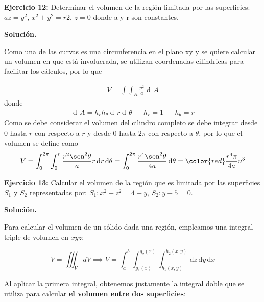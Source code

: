 \documentclass[12pt]{article}
\DeclareMathOperator{\di}{d\!}
\begin{document}
\noindent \textbf{Ejercicio 12:} Determinar el volumen de la región limitada por
 las superficies: $az = y^2$, $x^2+y^2 = r2$, $z=0$ donde a y r son constantes.

\vspace{5mm}

\noindent \textbf{Solución.}

\vspace{3mm}

Como una de las curvas es una circunferencia en el plano xy y se quiere calcular un
volumen en que está involucrada, se utilizan coordenadas cilíndricas para facilitar
los cálculos, por lo que 

\begin{align*}
	V = \int\int_{R} \frac{y^2}{a} \di A
\end{align*}
donde
\begin{align*}
	\di A = h_{r}h_{\theta} \di r \di \theta && h_{r}=1 && h_{\theta} = r
\end{align*} 
Como se debe considerar el volumen del cilindro completo se debe integrar desde
$0$ hasta $r$ con respecto a $r$ y desde $0$ hasta $2\pi$ con 
respecto a $\theta$, por lo que el volumen se define
como
\begin{align*}
	V = \int_{0}^{2\pi}\int_{0}^{r} \frac{r^2\sen^2\theta}{a}r \di r \di \theta
	= \int_0^{2\pi} \frac{r^4\sen^2\theta}{4a} \di \theta =\color{red} \frac{r^4\pi}{4a} u^3	
\end{align*} 

\noindent \textbf{Ejercicio 13:} Calcular el volumen de la región que es limitada por las superficies $S_1$ y $S_2$ representadas por: $S_1:x^2+z^2=4-y$, $S_2:y+5=0$.

\vspace{5mm}

\noindent \textbf{Solución.}

\vspace{3mm}

\noindent Para calcular el volumen de un sólido dada una región, empleamos una integral triple de volumen en $xyz$:

\begin{equation}\label{eqn:13-1}\tag{1}
	V = \iiint_V dV \implies V = \int_{a}^{b}\int_{g_1(x)}^{g_2(x)}\int_{h_1(x,y)}^{h_2(x,y)}\, \mathrm{d}z\,\mathrm{d}y\,\mathrm{d}x
\end{equation}

\noindent Al aplicar la primera integral, obtenemos justamente la integral doble que se utiliza para calcular \textbf{el volumen entre dos superficies}:
\end{document}
